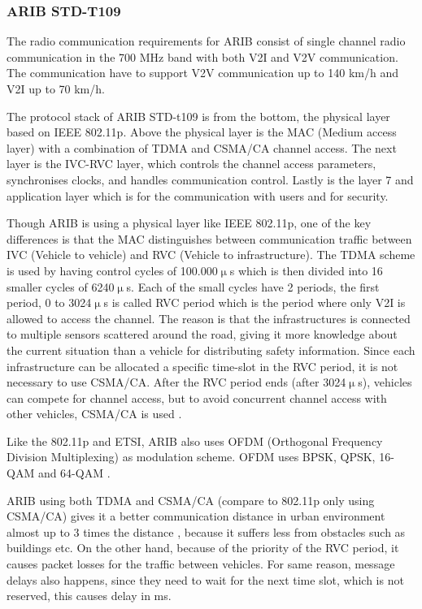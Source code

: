 \subsubsection{ARIB STD-T109}
% 
% 
% 
The radio communication requirements for ARIB consist of single channel radio communication in the 700 MHz band with both V2I and V2V communication. The communication have to support V2V communication up to 140 km/h and V2I up to 70 km/h.\par
% 
The protocol stack of ARIB STD-t109 is from the bottom, the physical layer based on IEEE 802.11p. Above the physical layer is the MAC (Medium access layer) with a combination of TDMA and CSMA/CA channel access. The next layer is the IVC-RVC layer, which controls the channel access parameters, synchronises clocks, and handles communication control. Lastly is the layer 7 and application layer which is for the communication with users and for security.\par
% 
Though ARIB is using a physical layer like IEEE 802.11p, one of the key differences is that the MAC distinguishes between communication traffic between IVC (Vehicle to vehicle) and RVC (Vehicle to infrastructure). The TDMA scheme is used by having control cycles of 100.000$\upmu$s which is then divided into 16 smaller cycles of  6240$\upmu$s. Each of the small cycles have 2 periods, the first period, 0 to 3024$\upmu$s is called RVC period which is the period where only V2I is allowed to access the channel. The reason is that the infrastructures is connected to multiple sensors scattered around the road, giving it more knowledge about the current situation than a vehicle for distributing safety information. Since each infrastructure can be allocated a specific time-slot in the RVC period, it is not necessary to use CSMA/CA. After the RVC period ends (after 3024$\upmu$s), vehicles can compete for channel access, but to avoid concurrent channel access with other vehicles, CSMA/CA is used \cite{Heinovski2016PerformanceSTD-T109}.\par
% 
Like the 802.11p and ETSI, ARIB also uses OFDM (Orthogonal Frequency Division 
Multiplexing) as modulation scheme. OFDM uses BPSK, QPSK, 16-QAM and 64-QAM \footnotemark.\par
% 
% 
% 
ARIB using both TDMA and CSMA/CA (compare to 802.11p only using CSMA/CA) gives it a better communication distance in urban environment almost up to 3 times the distance \cite{Heinovski2016PerformanceSTD-T109}, because it suffers less from obstacles such as buildings etc. On the other hand, because of the priority of the RVC period, it causes packet losses for the traffic between vehicles. For same reason, message delays also happens, since they need to wait for the next time slot, which is not reserved, this causes delay in ms. 